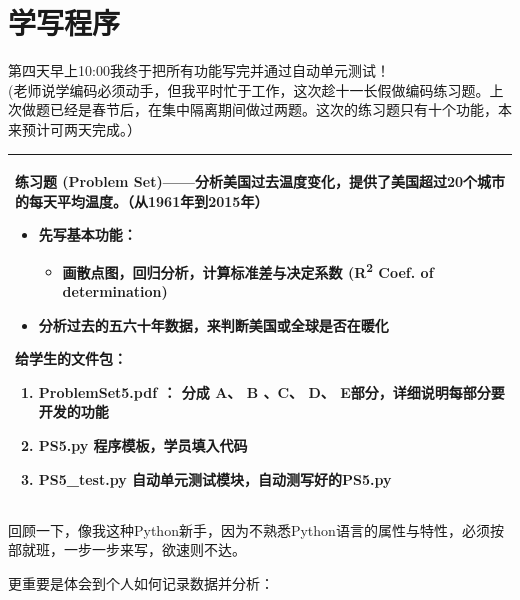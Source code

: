 \chapter{学写程序} %


第四天早上10:00我终于把所有功能写完并通过自动单元测试！\\
(老师说学编码必须动手，但我平时忙于工作，这次趁十一长假做编码练习题。上次做题已经是春节后，在集中隔离期间做过两题。这次的练习题只有十个功能，本来预计可两天完成。）

\begin{longtable}[]{@{}l@{}}
\toprule
\endhead
\begin{minipage}[t]{0.97\columnwidth}\raggedright
练习题 (Problem
Set)------分析美国过去温度变化，提供了美国超过20个城市的每天平均温度。（从1961年到2015年）

\begin{itemize}
\tightlist
\item
  先写基本功能：

  \begin{itemize}
  \tightlist
  \item
    画散点图，回归分析，计算标准差与决定系数 (R\textsuperscript{2} Coef.
    of determination)
  \end{itemize}
\end{itemize}

\begin{itemize}
\tightlist
\item
  分析过去的五六十年数据，来判断美国或全球是否在暖化
\end{itemize}

给学生的文件包：

\begin{enumerate}
\tightlist
\item
  ProblemSet5.pdf ： 分成 A、 B 、C、 D、
  E部分，详细说明每部分要开发的功能
\item
  PS5.py 程序模板，学员填入代码
\item
  PS5\_test.py 自动单元测试模块，自动测写好的PS5.py
\end{enumerate}\strut
\end{minipage}\tabularnewline
\bottomrule
\end{longtable}

回顾一下，像我这种Python新手，因为不熟悉Python语言的属性与特性，必须按部就班，一步一步来写，欲速则不达。

更重要是体会到个人如何记录数据并分析：

